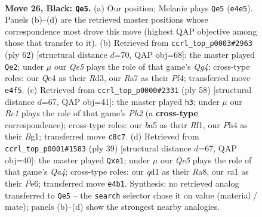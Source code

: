 \documentclass[11pt]{article}
\begin{document}
\clearpage

\begin{figure}[p]\centering
\begin{subfigure}{0.46\textwidth}\centering
\resizebox{\linewidth}{!}{%
\newchessgame
\chessboard[
  setfen={1Nr5/rp2bpk1/p3p3/B7/4q2p/4PP2/PP4PP/R2QR1K1 b - - 0 26},
  showmover=false,
  pgfstyle=straightmove, color=movearrow, markmove={e4-e5}
]}
\caption{}
\end{subfigure}\hfill
\begin{subfigure}{0.46\textwidth}\centering
\resizebox{\linewidth}{!}{%
\newchessgame
\chessboard[
  setfen={6k1/1p2b1p1/2qrPp2/3r3p/3p1PQ1/P2R3P/5BPK/4R3 w - - 0 32},
  showmover=false,
  pgfstyle=straightmove, color=movearrow, markmove={g4-e2}
]}
\caption{}
\end{subfigure}
\\[4pt]
\begin{subfigure}{0.46\textwidth}\centering
\resizebox{\linewidth}{!}{%
\newchessgame
\chessboard[
  setfen={4r1k1/1p1q2p1/p2r4/4p2p/P3Qb2/2R5/1PP3PP/5RBK w - - 0 30},
  showmover=false,
  pgfstyle=straightmove, color=movearrow, markmove={h2-h3}
]}
\caption{}
\end{subfigure}\hfill
\begin{subfigure}{0.46\textwidth}\centering
\resizebox{\linewidth}{!}{%
\newchessgame
\chessboard[
  setfen={r6r/pb2kpp1/1p2p2p/q7/P2P4/4PPP1/4B2P/R3QRK1 b - - 2 20},
  showmover=false,
  pgfstyle=straightmove, color=movearrow, markmove={a5-e1}
]}
\caption{}
\end{subfigure}
\caption{\textbf{Move 26, Black: \texttt{Qe5}.} (a) Our position; Melanie plays \texttt{Qe5} (\texttt{e4e5}). Panels (b)--(d) are the retrieved master positions whose correspondence most drove this move (highest QAP objective among those that transfer to it). (b) Retrieved from \texttt{ccrl\_top\_p0003\#2963} (ply 62) [structural distance $d$=70, QAP obj=68]: the master played \texttt{Qe2}; under $\mu$ our \emph{Qe5} plays the role of that game's \emph{Qg4}; cross-type roles: our \emph{Q}e4 as their \emph{R}d3, our \emph{R}a7 as their \emph{P}f4; transferred move \texttt{e4f5}. (c) Retrieved from \texttt{ccrl\_top\_p0000\#2331} (ply 58) [structural distance $d$=67, QAP obj=41]: the master played \texttt{h3}; under $\mu$ our \emph{Rc1} plays the role of that game's \emph{Ph2} (a \textbf{cross-type} correspondence); cross-type roles: our \emph{b}a5 as their \emph{R}f1, our \emph{P}h4 as their \emph{B}g1; transferred move \texttt{c8c7}. (d) Retrieved from \texttt{ccrl\_top\_p0001\#1583} (ply 39) [structural distance $d$=67, QAP obj=40]: the master played \texttt{Qxe1}; under $\mu$ our \emph{Qe5} plays the role of that game's \emph{Qa4}; cross-type roles: our \emph{q}d1 as their \emph{R}a8, our \emph{r}a1 as their \emph{P}e6; transferred move \texttt{e4b1}. Synthesis: no retrieved analog transferred to \texttt{Qe5} -- the \texttt{search} selector chose it on value (material / mate); panels (b)--(d) show the strongest nearby analogies.}
\label{fig:thought-m51}
\end{figure}
\end{document}

